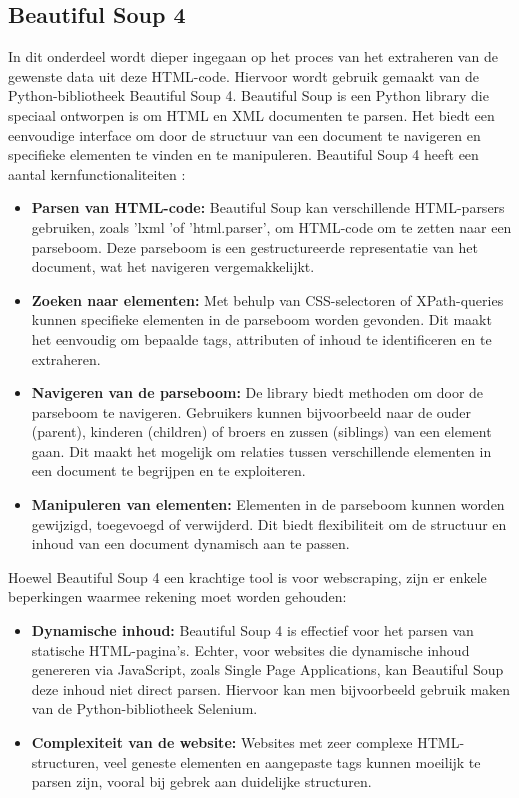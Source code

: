 \subsection{Beautiful Soup 4}
In dit onderdeel wordt dieper ingegaan op het proces van het extraheren van de gewenste data uit deze HTML-code. Hiervoor wordt gebruik gemaakt van de Python-bibliotheek Beautiful Soup 4.
Beautiful Soup is een Python library die speciaal ontworpen is om HTML en XML documenten te parsen. Het biedt een eenvoudige interface om door de structuur van een document te navigeren en specifieke elementen te vinden en te manipuleren. Beautiful Soup 4 heeft een aantal kernfunctionaliteiten \autocite{Soup2004}:

\begin{itemize}
    \item \textbf{Parsen van HTML-code:} Beautiful Soup kan verschillende HTML-parsers gebruiken, zoals 'lxml 'of 'html.parser', om HTML-code om te zetten naar een parseboom. Deze parseboom is een gestructureerde representatie van het document, wat het navigeren vergemakkelijkt.

    \item \textbf{Zoeken naar elementen:} Met behulp van CSS-selectoren of XPath-queries kunnen specifieke elementen in de parseboom worden gevonden. Dit maakt het eenvoudig om bepaalde tags, attributen of inhoud te identificeren en te extraheren.

    \item \textbf{Navigeren van de parseboom:}  De library biedt methoden om door de parseboom te navigeren. Gebruikers kunnen bijvoorbeeld naar de ouder (parent), kinderen (children) of broers en zussen (siblings) van een element gaan. Dit maakt het mogelijk om relaties tussen verschillende elementen in een document te begrijpen en te exploiteren.

    \item \textbf{Manipuleren van elementen:}  Elementen in de parseboom kunnen worden gewijzigd, toegevoegd of verwijderd. Dit biedt flexibiliteit om de structuur en inhoud van een document dynamisch aan te passen.
\end{itemize}

Hoewel Beautiful Soup 4 een krachtige tool is voor webscraping, zijn er enkele beperkingen waarmee rekening moet worden gehouden:

\begin{itemize}
    \item \textbf{Dynamische inhoud:} Beautiful Soup 4 is effectief voor het parsen van statische HTML-pagina's. Echter, voor websites die dynamische inhoud genereren via JavaScript, zoals Single Page Applications, kan Beautiful Soup deze inhoud niet direct parsen. Hiervoor kan men bijvoorbeeld gebruik maken van de Python-bibliotheek Selenium.

    \item \textbf{Complexiteit van de website: } Websites met zeer complexe HTML-structuren, veel geneste elementen en aangepaste tags kunnen moeilijk te parsen zijn, vooral bij gebrek aan duidelijke structuren.
\end{itemize}

